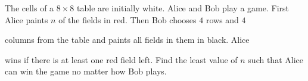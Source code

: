 The cells of a $8 \times 8$ table are initially white. Alice and Bob play a game. First Alice paints $n$ of the fields in red. Then Bob chooses $4$ rows and $4$

 columns from the table and paints all fields in them in black. Alice 

wins if there is at least one red field left. Find the least value of $n$ such that Alice can win the game no matter how Bob plays.